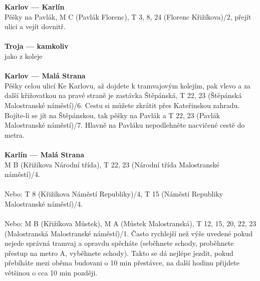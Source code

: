 \textbf{Karlov --- Karlín}\\
Pěšky na Pavlák, M C (Pavlák \ra Florenc), T 3, 8, 24 (Florenc \ra Křižíkova)/2,
přejít ulici a vejít dovnitř.
\\\\
\textbf{Troja --- kamkoliv}\\
jako z koleje
\\\\
\textbf{Karlov --- Malá Strana}\\
Pěšky celou ulicí Ke Karlovu, až dojdete k tramvajovým kolejím, pak vlevo a za
další křižovatkou na pravé straně je zastávka Štěpánská, T 22, 23 (Štěpánská \ra
Malostranské náměstí)/6. Cestu si můžete zkrátit přes Kateřinskou zahradu.
Bojíte-li se jít na Štěpánskou, tak pěšky na Pavlák a T 22, 23 (Pavlák \ra
Malostranské náměstí)/7. Hlavně na Pavláku nepodlehněte nacvičené cestě do
metra.
\\\\
\textbf{Karlín --- Malá Strana}\\
M B (Křižíkova \ra Národní třída), T 22, 23 (Národní třída \ra Malostranské
náměstí)/4.
\\\\
Nebo: T 8 (Křižíkova \ra Náměstí Republiky)/4, T 15 (Náměstí Republiky \ra
Malostranské náměstí)/4.
\\\\
Nebo: M B (Křižíkova \ra Můstek), M A (Můstek \ra Malostranská), T 12, 15, 20,
22, 23 (Malostranská \ra Malostranské náměstí)/1. Často rychlejší než výše
uvedené pokud nejede správná tramvaj a opravdu spěcháte (seběhnete schody,
proběhnete přestup na metro A, vyběhnete schody). Takto se dá nejlépe jezdit,
pokud přebíháte mezi oběma budovani o 10 min přestávce, na další hodinu přijdete
většinou o cca 10 min později.